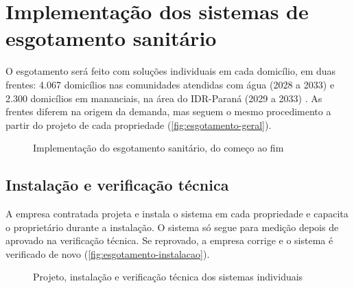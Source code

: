 \section{Implementação dos sistemas de esgotamento sanitário}
\label{sec:esgotamento}

O esgotamento será feito com soluções individuais em cada domicílio, em duas
frentes: 4.067 domicílios nas comunidades atendidas com água (2028 a 2033) e
2.300 domicílios em mananciais, na área do IDR-Paraná (2029 a 2033)
\cite{custo2026}. As frentes diferem na origem da demanda, mas seguem o mesmo
procedimento a partir do projeto de cada propriedade
(\autoref{fig:esgotamento-geral}).

\begin{figure}[htbp]
  \centering
  \caption{Implementação do esgotamento sanitário, do começo ao fim}
  \label{fig:esgotamento-geral}
\end{figure}


\subsection{Instalação e verificação técnica}
\label{subsec:esgotamento-instalacao}

A empresa contratada projeta e instala o sistema em cada propriedade e
capacita o proprietário durante a instalação. O sistema só segue para medição
depois de aprovado na verificação técnica. Se reprovado, a empresa corrige e o
sistema é verificado de novo (\autoref{fig:esgotamento-instalacao}).

\begin{figure}[htbp]
  \centering
  \caption{Projeto, instalação e verificação técnica dos sistemas individuais}
  \label{fig:esgotamento-instalacao}
\end{figure}

